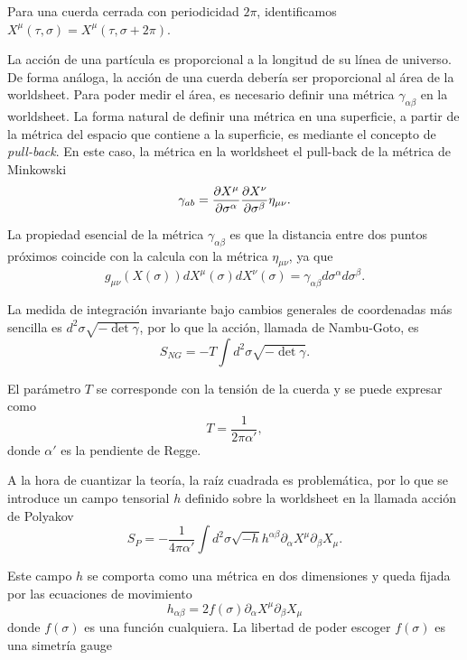 Para una cuerda cerrada con periodicidad $2\pi$, identificamos $X^\mu(\tau,\sigma)=X^\mu(\tau,\sigma+2\pi)$.

La acción de una partícula es proporcional a la longitud de su línea de universo.
De forma análoga, la acción de una cuerda debería ser proporcional al área de la
worldsheet.
Para poder medir el área, es necesario definir una métrica $\gamma_{\alpha\beta}$ en la worldsheet.
La forma natural de definir una métrica en una superficie, a partir de la métrica del espacio que
contiene a la superficie, es mediante el concepto de \emph{pull-back}.
En este caso, la métrica en la worldsheet el pull-back de la métrica de Minkowski
\begin{equation}
  \gamma_{ab}=\pdv{X^\mu}{\sigma^\alpha}\pdv{X^\nu}{\sigma^\beta}\eta_{\mu\nu}.
\end{equation}

La propiedad esencial de la métrica $\gamma_{\alpha\beta}$ es que la distancia entre dos puntos próximos 
coincide con la calcula con la métrica $\eta_{\mu\nu}$, ya que
\begin{equation}
  g_{\mu\nu}(X(\sigma)) dX^\mu(\sigma)dX^\nu(\sigma) = \gamma_{\alpha\beta} d\sigma^\alpha d\sigma^\beta.
\end{equation}



La medida de integración invariante bajo cambios generales de coordenadas más sencilla 
es $d^2\sigma \sqrt{-\det\gamma}$, por lo que la acción, llamada de Nambu-Goto, es
\begin{equation}
  S_{NG}=-T\int d^2\sigma \sqrt{-\det\gamma}.
\end{equation}

El parámetro $T$ se corresponde con la tensión de la cuerda y se puede expresar como
\begin{equation}
  T=\frac{1}{2\pi\alpha'},
\end{equation}
donde $\alpha'$ es la pendiente de Regge.

A la hora de cuantizar la teoría, la raíz cuadrada es problemática, por lo que se introduce
un campo tensorial $h$ definido sobre la worldsheet en la llamada acción de Polyakov
\begin{equation}
  S_P=-\frac{1}{4\pi\alpha'}\int d^2\sigma  \sqrt{-h}h^{\alpha\beta}\partial_\alpha X^\mu \partial_\beta X_\mu.
\end{equation}

Este campo $h$ se comporta como una métrica en dos dimensiones y queda fijada por las
ecuaciones de movimiento
\begin{equation}
  h_{\alpha\beta}=2f(\sigma)\partial_\alpha X^\mu \partial_\beta X_\mu
\end{equation}
donde $f(\sigma)$ es una función cualquiera. La libertad de poder escoger $f(\sigma)$
es una simetría gauge

